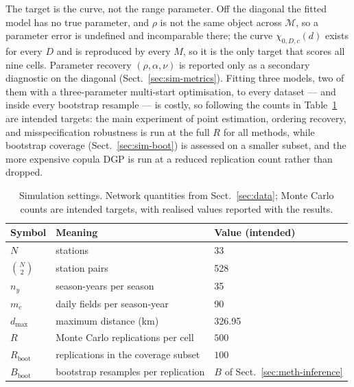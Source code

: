 The target is the curve, not the range parameter. Off the diagonal the fitted model has no true parameter, and \(\rho\) is not the same object across \(\mathcal M\), so a parameter error is undefined and incomparable there; the curve \(\chi_{0,D,c}(d)\) exists for every \(D\) and is reproduced by every \(M\), so it is the only target that scores all nine cells. Parameter recovery \((\rho,\alpha,\nu)\) is reported only as a secondary diagnostic on the diagonal (Sect.~\ref{sec:sim-metrics}). Fitting three models, two of them with a three-parameter multi-start optimisation, to every dataset --- and inside every bootstrap resample --- is costly, so following \citet{morris2019} the counts in Table~\ref{tab:sim-settings} are intended targets: the main experiment of point estimation, ordering recovery, and misspecification robustness is run at the full \(R\) for all methods, while bootstrap coverage (Sect.~\ref{sec:sim-boot}) is assessed on a smaller subset, and the more expensive copula DGP is run at a reduced replication count rather than dropped.

\begin{table}[t]
  \centering
  \caption{Simulation settings. Network quantities from Sect.~\ref{sec:data}; Monte Carlo counts are intended targets, with realised values reported with the results.}
  \label{tab:sim-settings}
  \begin{tabular}{lll}
    \hline
    Symbol                & Meaning                             & Value (intended)                        \\
    \hline
    \(N\)                 & stations                            & 33                                      \\
    \(\binom{N}{2}\)      & station pairs                       & 528                                     \\
    \(n_y\)               & season-years per season             & 35                                      \\
    \(m_c\)               & daily fields per season-year        & 90                                      \\
    \(d_{\max}\)          & maximum distance (km)               & 326.95                                  \\
    \(R\)                 & Monte Carlo replications per cell   & \(500\)                                 \\
    \(R_{\mathrm{boot}}\) & replications in the coverage subset & \(100\)                                 \\
    \(B_{\mathrm{boot}}\) & bootstrap resamples per replication & \(B\) of Sect.~\ref{sec:meth-inference} \\
    \hline
  \end{tabular}
\end{table}

